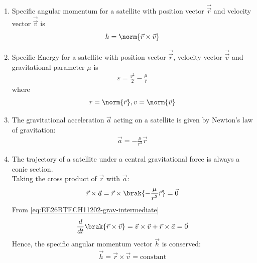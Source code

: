 \begin{enumerate}[label=\thesubsection.\arabic*, ref=\thesubsection.\theenumi]
\begin{align}
	\mu=GM
\end{align}
where $M$ is the mass of the body
\item Specific angular momentum for a satellite with position vector $\vec{\vec{r}}$ and velocity vector $\vec{\vec{v}}$ is 
\begin{align}
	h= \norm{\vec{r} \times \vec{v}} \label{eq:EE26BTECH11202-ang-moment}
\end{align}
\item Specific Energy for a satellite with position vector $\vec{\vec{r}}$, velocity vector $\vec{\vec{v}}$ and gravitational parameter $\mu$ is 
\begin{align}
\varepsilon = \frac{v^2}{2} - \frac{\mu}{r} \label{eq:EE26BTECH11202-energy}
\end{align}
where
\begin{align}
	r=\norm{\vec{r}}, v=\norm{\vec{v}}
\end{align}
\item The gravitational acceleration $\vec{a}$ acting on a satellite is given by Newton's law of gravitation:
\begin{align}
\vec{a} = -\frac{\mu}{r^3}\vec{r}
\label{eq:EE26BTECH11202-grav_acc}
\end{align}
\item The trajectory of a satellite under a central gravitational force is always a conic section. \\
\solution
Taking the cross product of $\vec{r}$ with $\vec{a}$:
\begin{align}
	\vec{r} \times \vec{a} = \vec{r} \times \brak{-\frac{\mu}{r^3}\vec{r}} = \vec{0} \label{eq:EE26BTECH11202-grav-intermediate}
\end{align}
From \eqref{eq:EE26BTECH11202-grav-intermediate}
\begin{align}\frac{d}{dt}\brak{\vec{r} \times \vec{v}} = \vec{v} \times \vec{v} + \vec{r} \times \vec{a} = \vec{0}
\end{align}
Hence, the specific angular momentum vector $\vec{h}$ is conserved:
\begin{align}
\vec{h} = \vec{r} \times \vec{v} = \text{constant}
\label{eq:EE26BTECH11202-ang_mom}
\end{align}


\end{enumerate}
